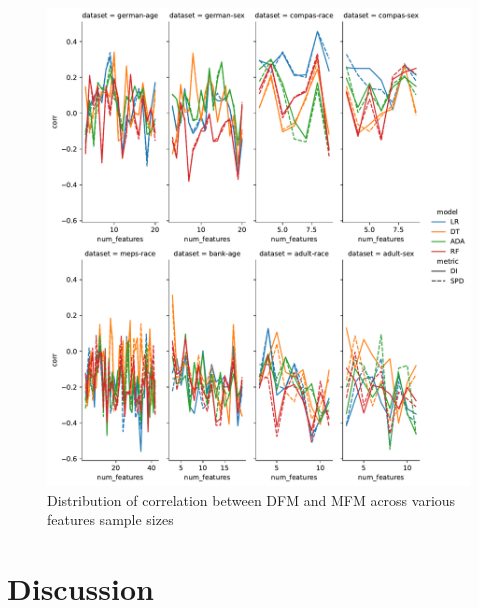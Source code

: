 \documentclass{article}
\begin{document}
\begin{figure}
  \centering
  \includegraphics[width=0.95\linewidth]{lineplot--num-features--corr.pdf}
  \caption{Distribution of correlation between DFM and MFM across
    various features sample sizes}
  \label{fig:lineplot--num-features--corr}
\end{figure}

\section{Discussion}\label{sec:discuss}



\end{document}
